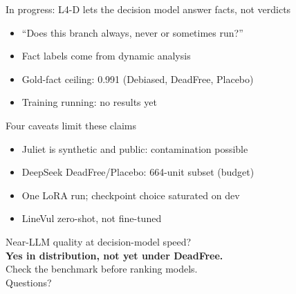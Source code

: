 \begin{frame}{In progress: L4-D lets the decision model answer facts, not verdicts}
  \centering
  \vspace{8pt}
  \begin{itemize}
    \item ``Does this branch always, never or sometimes run?''
    \item Fact labels come from dynamic analysis
    \item Gold-fact ceiling: 0.991 (Debiased, DeadFree, Placebo)
    \item \alert{Training running: no results yet}
  \end{itemize}
\end{frame}

\begin{frame}{Four caveats limit these claims}
  \begin{itemize}
    \item Juliet is synthetic and public: contamination possible
    \item DeepSeek DeadFree/Placebo: 664-unit subset (budget)
    \item One LoRA run; checkpoint choice saturated on dev
    \item LineVul zero-shot, not fine-tuned
  \end{itemize}
\end{frame}

\begin{frame}[standout]
  Near-LLM quality at decision-model speed?\\[6pt]
  \textbf{Yes in distribution, not yet under DeadFree.}\\[14pt]
  {\normalsize Check the benchmark before ranking models.}\\[18pt]
  Questions?
\end{frame}
